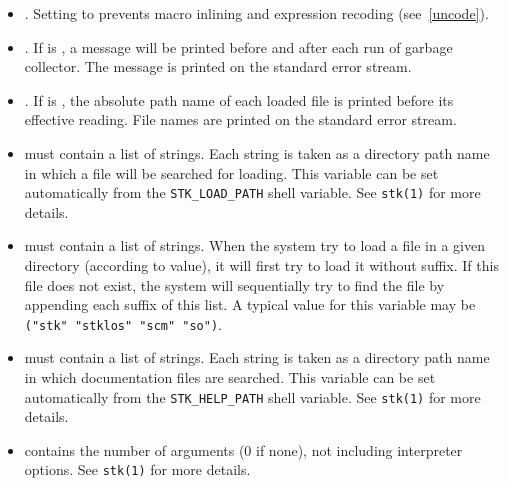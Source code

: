 \begin{itemize}

\item {\tt{}}. Setting
    {\tt {}} to {\schtrue} prevents macro inlining and 
    expression recoding (see~\ref{uncode}).
        
\item {\tt{}}. If 
      {\tt{}} is {\schtrue}, a message will be printed before
      and after each run of garbage collector. The message is printed on the
      standard error stream.
     
\item {\tt{}}. If 
      {\tt{}} is {\schtrue}, the absolute path name of
      each loaded file is printed before its effective reading. File names
      are printed on the standard error stream.
      
    \item {\tt{}} must
      contain a list of strings. Each string is taken as a directory
      path name in which a file will be searched for loading. This
      variable can be set automatically from the {\tt STK\_LOAD\_PATH}
      shell variable. See {\tt stk(1)} for more details.

\item  {\tt{}}
      must contain a list of strings. When the system try to load a
      file in a given directory (according to {\tt{}}
      value), it will first try to load it without suffix. If this
      file does not exist, the system will sequentially try to find the file by
      appending each suffix of this list. A typical value for this
      variable may be {\tt ("stk" "stklos" "scm" "so")}.
      
    \item {\tt{}} must contain a list of
      strings.  Each string is taken as a directory path name in which
      documentation files are searched. This variable can be set
      automatically from the {\tt STK\_HELP\_PATH} shell variable. See
      {\tt stk(1)} for more details.

\item {\tt{}} contains the
       number of arguments  (0 if none), not including interpreter
       options. See {\tt stk(1)} for more details.


\end{itemize}
